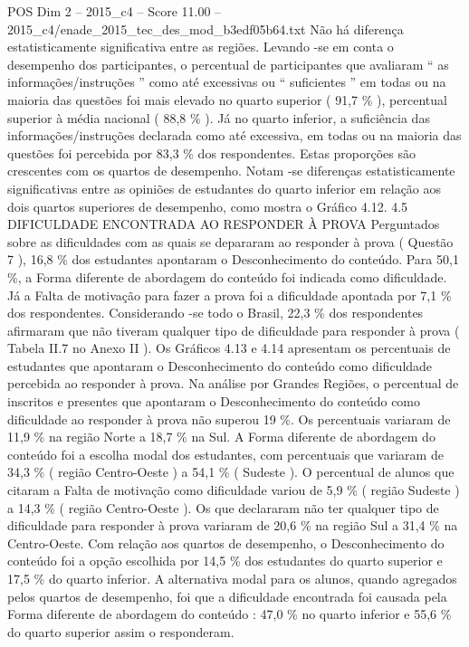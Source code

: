\begin{textsample}{POS Dim 2 – 2015\_c4 – Score 11.00 – 2015\_c4/enade\_2015\_tec\_des\_mod\_b3edf05b64.txt}
Não há diferença estatisticamente significativa entre as regiões.
Levando -se em conta o desempenho dos participantes, o percentual de participantes que avaliaram “ as informações/instruções ” como até excessivas ou “ suficientes ” em todas ou na maioria das questões foi mais elevado no quarto superior ( 91,7 \% ), percentual superior à média nacional ( 88,8 \% ).
Já no quarto inferior, a suficiência das informações/instruções declarada como até excessiva, em todas ou na maioria das questões foi percebida por 83,3 \% dos respondentes.
Estas proporções são crescentes com os quartos de desempenho.
Notam -se diferenças estatisticamente significativas entre as opiniões de estudantes do quarto inferior em relação aos dois quartos superiores de desempenho, como mostra o Gráfico 4.12. 4.5 DIFICULDADE ENCONTRADA AO RESPONDER À PROVA Perguntados sobre as dificuldades com as quais se depararam ao responder à prova ( Questão 7 ), 16,8 \% dos estudantes apontaram o Desconhecimento do conteúdo.
Para 50,1 \%, a Forma diferente de abordagem do conteúdo foi indicada como dificuldade.
Já a Falta de motivação para fazer a prova foi a dificuldade apontada por 7,1 \% dos respondentes.
Considerando -se todo o Brasil, 22,3 \% dos respondentes afirmaram que não tiveram qualquer tipo de dificuldade para responder à prova ( Tabela II.7 no Anexo II ).
Os Gráficos 4.13 e 4.14 apresentam os percentuais de estudantes que apontaram o Desconhecimento do conteúdo como dificuldade percebida ao responder à prova.
Na análise por Grandes Regiões, o percentual de inscritos e presentes que apontaram o Desconhecimento do conteúdo como dificuldade ao responder à prova não superou 19 \%.
Os percentuais variaram de 11,9 \% na região Norte a 18,7 \% na Sul.
A Forma diferente de abordagem do conteúdo foi a escolha modal dos estudantes, com percentuais que variaram de 34,3 \% ( região Centro-Oeste ) a 54,1 \% ( Sudeste ).
O percentual de alunos que citaram a Falta de motivação como dificuldade variou de 5,9 \% ( região Sudeste ) a 14,3 \% ( região Centro-Oeste ).
Os que declararam não ter qualquer tipo de dificuldade para responder à prova variaram de 20,6 \% na região Sul a 31,4 \% na Centro-Oeste.
Com relação aos quartos de desempenho, o Desconhecimento do conteúdo foi a opção escolhida por 14,5 \% dos estudantes do quarto superior e 17,5 \% do quarto inferior.
A alternativa modal para os alunos, quando agregados pelos quartos de desempenho, foi que a dificuldade encontrada foi causada pela Forma diferente de abordagem do conteúdo : 47,0 \% no quarto inferior e 55,6 \% do quarto superior assim o responderam.

\end{textsample}
